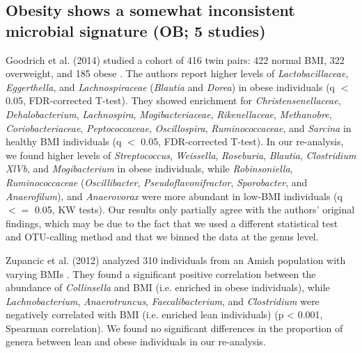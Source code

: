 \documentclass{article}
\begin{document}
{\subsection*{Obesity shows a somewhat inconsistent microbial signature (OB; 5 studies)}

Goodrich et al. (2014) studied a cohort of 416 twin pairs: 422 normal BMI, 322 overweight, and 185 obese \cite{ob-goodrich}. 
The authors report higher levels of \textit{Lactobacillaceae}, \textit{Eggerthella}, and \textit{Lachnospiraceae} (\textit{Blautia} and \textit{Dorea}) in obese individuals (q $<$ 0.05, FDR-corrected T-test). 
They showed enrichment for \textit{Christensenellaceae}, \textit{Dehalobacterium}, \textit{Lachnospira}, \textit{Mogibacteriaceae}, \textit{Rikenellaceae}, \textit{Methanobre}, \textit{Coriobacteriaceae}, \textit{Peptococcaceae}, \textit{Oscillospira}, \textit{Ruminococcaceae}, and \textit{Sarcina} in healthy BMI individuals (q $<$ 0.05, FDR-corrected T-test). 
In our re-analysis, we found higher levels of \textit{Streptococcus}, \textit{Weissella}, \textit{Roseburia}, \textit{Blautia}, \textit{Clostridium XlVb}, and \textit{Mogibacterium} in obese individuals, while \textit{Robinsoniella}, \textit{Ruminococcaceae} (\textit{Oscillibacter}, \textit{Pseudoflavonifractor}, \textit{Sporobacter}, and \textit{Anaerofilum}), and \textit{Anaerovorax} were more abundant in low-BMI individuals (q $<=$ 0.05, KW tests). 
Our results only partially agree with the authors' original findings, which may be due to the fact that we used a different statistical test and OTU-calling method and that we binned the data at the genus level.

Zupancic et al. (2012) analyzed 310 individuals from an Amish population with varying BMIs \cite{ob-zupancic}. 
They found a significant positive correlation between the abundance of \textit{Collinsella} and BMI (i.e. enriched in obese individuals), while \textit{Lachnobacterium}, \textit{Anaerotruncus}, \textit{Faecalibacterium}, and \textit{Clostridium} were negatively correlated with BMI (i.e. enriched lean individuals) (p < 0.001, Spearman correlation). 
We found no significant differences in the proportion of genera between lean and obese individuals in our re-analysis.

}
\end{document}
